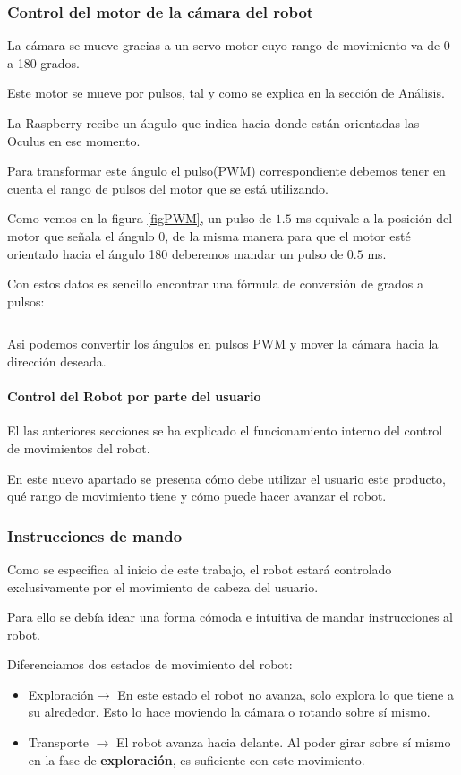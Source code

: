 \documentclass[twoside, 12pt]{epstfg}
\begin{document}
\subsubsection{\textbf{Control del motor de la cámara del robot}}

La cámara se mueve gracias a un servo motor cuyo rango de movimiento va de 0 a 180 grados.

Este motor se mueve por pulsos, tal y como se explica en la sección de Análisis.

La Raspberry recibe un ángulo que indica hacia donde están orientadas las Oculus en ese momento.

Para transformar este ángulo el pulso(PWM) correspondiente debemos tener en cuenta el rango de pulsos del motor que se está utilizando.

Como vemos en la figura \ref{figPWM}, un pulso de $1.5$ ms equivale a la posición del motor que señala el ángulo 0, de la misma manera para que el motor esté orientado hacia el ángulo 180 deberemos mandar un pulso de $0.5$ ms.

Con estos datos es sencillo encontrar una fórmula de conversión de grados a pulsos:

$$$$

Asi podemos convertir los ángulos en pulsos PWM y mover la cámara hacia la dirección deseada.

\paragraph{Control del Robot por parte del usuario}

El las anteriores secciones se ha explicado el funcionamiento interno del control de movimientos del robot.

En este nuevo apartado se presenta cómo debe utilizar el usuario este producto, qué rango de movimiento tiene y cómo puede hacer avanzar el robot.

\subsubsection{\textbf{Instrucciones de mando}}

Como se especifica al inicio de este trabajo, el robot estará controlado exclusivamente por el movimiento de cabeza del usuario.

Para ello se debía idear una forma cómoda e intuitiva de mandar instrucciones al robot.

Diferenciamos dos estados de movimiento del robot:
\begin{itemize}
	\item Exploración$\rightarrow$ En este estado el robot no avanza, solo explora lo que tiene a su alrededor. Esto lo hace moviendo la cámara o rotando sobre sí mismo.
	\item Transporte $\rightarrow$ El robot avanza hacia delante. Al poder girar sobre sí mismo en la fase de \textbf{exploración}, es suficiente con este movimiento.
\end{itemize}
\end{document}
